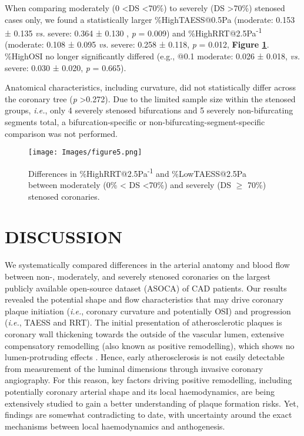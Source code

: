 \documentclass[preprint,11pt,review]{elsarticle}
\begin{document}
When comparing moderately (0 \textless DS \textless 70\%) to severely (DS \textgreater 70\%) stenosed cases only, we found a statistically larger \%HighTAESS@0.5Pa (moderate: 0.153 ± 0.135 \textit{vs.} severe: 0.364 ± 0.130 , \textit{p} = 0.009) and \%HighRRT@2.5Pa\textsuperscript{-1} (moderate: 0.108 ± 0.095 \textit{vs.} severe: 0.258 ± 0.118, \textit{p} = 0.012, \textbf{Figure \ref{fig:progression}}. \%HighOSI no longer significantly differed (e.g., @0.1 moderate: 0.026 ± 0.018, \textit{vs.} severe: 0.030 ± 0.020, \textit{p} = 0.665).  

Anatomical characteristics, including curvature, did not statistically differ across the coronary tree (\textit{p} \textgreater 0.272). Due to the limited sample size within the stenosed groups, \textit{i.e.}, only 4 severely stenosed bifurcations and 5 severely non-bifurcating segments total, a bifurcation-specific or non-bifurcating-segment-specific comparison was not performed.

\begin{figure}
    \centering
    \texttt{[image: Images/figure5.png]}
    \caption{Differences in \%HighRRT@2.5Pa\textsuperscript{-1} and \%LowTAESS@2.5Pa between moderately (0\% < DS \textless 70\%) and severely (DS $\geq$ 70\%) stenosed coronaries. }
    \label{fig:progression}
\end{figure}

\section{DISCUSSION}

We systematically compared differences in the arterial anatomy and blood flow between non-, moderately, and severely stenosed coronaries on the largest publicly available open-source dataset (ASOCA) of CAD patients. Our results revealed the potential shape and flow characteristics that may drive coronary plaque initiation (\textit{i.e.}, coronary curvature and potentially OSI) and progression (\textit{i.e.}, TAESS and RRT). The initial presentation of atherosclerotic plaques is coronary wall thickening towards the outside of the vascular lumen, extensive compensatory remodelling (also known as positive remodelling), which shows no lumen-protruding effects \cite{Samady2011Coronary}. Hence, early atherosclerosis is not easily detectable from measurement of the luminal dimensions through invasive coronary angiography. For this reason, key factors driving positive remodelling, including potentially coronary arterial shape and its local haemodynamics, are being extensively studied to gain a better understanding of plaque formation risks. Yet, findings are somewhat contradicting to date, with uncertainty around the exact mechanisms between local haemodynamics and anthogenesis.
\end{document}
